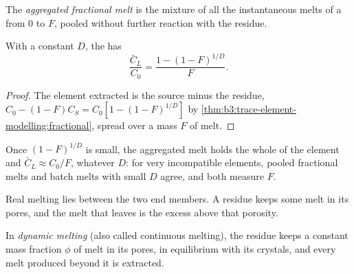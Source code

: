 \begin{omfigure}
\par{}\label{fig:b3:trace-element-modelling:curves}
\end{omfigure}

\begin{definition}\label{def:b3:trace-element-modelling:fractional}
The \emph{aggregated fractional melt} is the
mixture of all the instantaneous melts of a  from $0$ to
$F$, pooled without further reaction with the residue.
\end{definition}

\begin{proposition}
\label{prop:b3:trace-element-modelling:aggregate}
With a constant $D$, the  has
\[
\frac{\bar C_L}{C_0} = \frac{1 - (1 - F)^{1/D}}{F}.
\]
\end{proposition}

\begin{proof}
The element extracted is the source minus the residue,
$C_0 - (1 - F)C_S = C_0[1 - (1 - F)^{1/D}]$ by \cref{thm:b3:trace-element-modelling:fractional},
spread over a mass $F$ of melt.
\end{proof}

Once $(1 - F)^{1/D}$ is small, the aggregated melt holds the whole of the
element and $\bar C_L \approx C_0/F$, whatever $D$: for very incompatible
elements, pooled fractional melts and batch melts with small $D$ agree, and
both measure $F$.

Real melting lies between the two end members. A residue keeps some melt in
its pores, and the melt that leaves is the excess above that porosity.

\begin{definition}\label{def:b3:trace-element-modelling:dynamic}
In \emph{dynamic melting} (also called continuous
melting), the residue keeps a constant mass fraction $\phi$ of melt in its
pores, in equilibrium with its crystals, and every melt produced beyond it is
extracted.
\end{definition}

